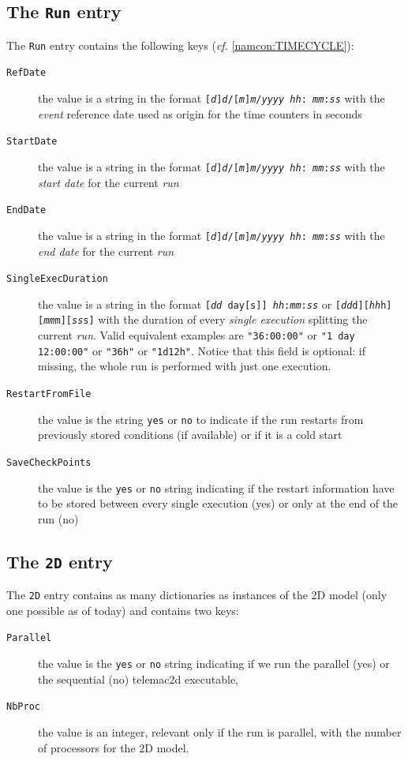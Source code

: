 \documentclass[Coupling]{../../data/TelemacDoc} %
\begin{document}
\subsection{The \texttt{Run} entry}
The \texttt{Run} entry contains the following keys ({\em cf.} \ref{namcon:TIMECYCLE}):
\begin{description}
  \item[\texttt{RefDate}] the value is a string in the format
    \texttt{[{\em d}]{\em d}/[{\em m}]{\em m}/{\em yyyy} {\em hh}:{\em
        mm}:{\em ss}} with the {\em event} reference 
    date used as origin for the time counters in seconds
  \item[\texttt{StartDate}] the value is a string in the format
    \texttt{[{\em d}]{\em d}/[{\em m}]{\em m}/{\em yyyy} {\em hh}:{\em
        mm}:{\em ss}} with the {\em start date} for the 
    current {\em run}
  \item[\texttt{EndDate}] the value is a string in the format
    \texttt{[{\em d}]{\em d}/[{\em m}]{\em m}/{\em yyyy} {\em hh}:{\em
        mm}:{\em ss}} with the {\em end date} for the 
    current {\em run}
  \item[\texttt{SingleExecDuration}] the value is a string in the format
    \texttt{[{\em dd} day[s]] {\em hh}:{\em mm}:{\em ss}} or
    \texttt{[{\em dd}d][{\em hh}h][{\em mm}m][{\em ss}s]} with the
    duration of every {\em single execution} 
    splitting the current {\em run}. Valid equivalent examples are
    \texttt{"36:00:00"} or \texttt{"1 day 12:00:00"} or \texttt{"36h"}
    or \texttt{"1d12h"}. Notice that this field is optional: if
    missing, the whole run is performed with just one execution. 
  \item[\texttt{RestartFromFile}] the value is the string \texttt{yes}
    or \texttt{no} to indicate if the run restarts from previously
    stored conditions (if available) or if it is a cold start   
  \item[\texttt{SaveCheckPoints}] the value is the \texttt{yes} or
    \texttt{no} string indicating if the restart information have to
    be stored between every single execution (yes) or only at the end
    of the run (no)
\end{description}


\subsection{The \texttt{2D} entry}
The \texttt{2D} entry contains as many dictionaries as instances of the 2D
model (only one possible as of today) and contains two keys: 
\begin{description}
  \item[\texttt{Parallel}] the value is the \texttt{yes} or
    \texttt{no} string indicating if we run the parallel (yes) or the
    sequential (no) telemac2d executable, 
  \item[\texttt{NbProc}] the value is an integer, relevant only if the
    run is parallel, with the number of processors for the 2D model.
\end{description}
\end{document}
